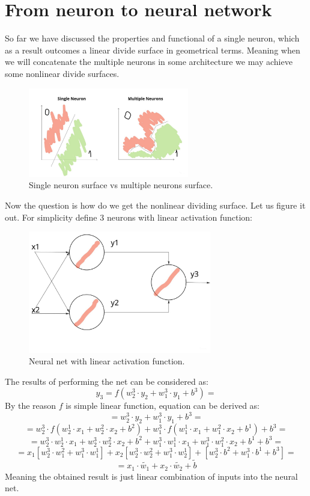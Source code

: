 \documentclass{article}
\begin{document}
\section{From neuron to neural network}
So far we have discussed the properties and functional of a single neuron, which as a result outcomes a linear divide surface in geometrical terms. Meaning when we will concatenate the multiple neurons in some architecture we may achieve some nonlinear divide surfaces.
\begin{figure}[h]
    \centering \includegraphics[width=7cm]{images/neuron_to_neural_net.jpg}
    \caption {Single neuron surface vs multiple neurons surface.}
\end{figure}

Now the question is how do we get the nonlinear dividing surface. Let us figure it out.
For simplicity define 3 neurons with linear activation function:
\begin{figure}[h]
    \centering \includegraphics[width=8cm]{images/3_neurons_net.jpg}
    \caption {Neural net with linear activation function.}
\end{figure}
The results of performing the net can be considered as:
\[ y_3 = f(w_2^3 \cdot y_2+w_1^3 \cdot y_1+b^3) = \]
By the reason $f$ is simple linear function, equation can be derived as:
\[ = w_2^3 \cdot y_2+w_1^3 \cdot y_1+b^3 = \] 
\[ = w_2^3 \cdot f(w_2^1\cdot x_1+w_2^2 \cdot x_2+b^2) + w_1^3 \cdot f(w_1^1 \cdot x_1+w_1^2 \cdot x_2+b^1) + b^3 = \]   
\[ = w_2^3 \cdot w_2^1 \cdot x_1+w_2^3 \cdot w_2^2 \cdot x_2+b^2 + w_1^3 \cdot w_1^1 \cdot x_1+w_1^3 \cdot w_1^2 \cdot x_2+b^1+b^3 = \]
\[ = x_1[w_2^3 \cdot w_1^2 + w_1^3 \cdot w_1^1] + x_2[w_2^3 \cdot w_2^2 + w_1^3 \cdot w_2^1] + [w_2^3 \cdot b^2+w_1^3 \cdot b^1+b^3] = \]
\[ =  x_1\cdot \tilde{w_1} + x_2\cdot \tilde{w_2} + \tilde{b} \]
Meaning the obtained result is just linear combination of inputs into the neural net. 
\end{document}
